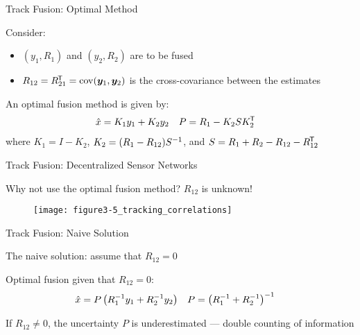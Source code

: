 \documentclass[aspectratio=1610]{beamer}
\begin{document}
\begin{frame}{Track Fusion: Optimal Method}

Consider:
\begin{itemize}
    \item $(y_1,R_1)$ and $(y_2,R_2)$ are to be fused
    \item $R_{12}=R_{21}^{\mkern-1.5mu\mathsf{T}}=\operatorname*{\rm cov}(\bm{y}_1,\bm{y}_2)$ is the cross-covariance between the estimates
\end{itemize}

An optimal fusion method is given by:
\begin{align*}
    \hat{x} &= K_1y_1 + K_2y_2 &
    P &= R_1 - K_2SK_2^{\mkern-1.5mu\mathsf{T}}
\end{align*}
where $K_1=I-K_2$, $K_2=(R_1-R_{12})S^{-1}$, and $S=R_1+R_2-R_{12}-R_{12}^{\mkern-1.5mu\mathsf{T}}$

\end{frame}


\begin{frame}{Track Fusion: Decentralized Sensor Networks}

Why not use the optimal fusion method? \alert{$R_{12}$ is unknown!}

\vspace{2em}

\begin{figure}
    \centering
    \texttt{[image: figure3-5\_tracking\_correlations]}
\end{figure}

\end{frame}


\begin{frame}{Track Fusion: Naive Solution}

The naive solution: \alert{assume that $R_{12}=0$}

\vspace{1em}

Optimal fusion given that $R_{12}=0$:
\begin{align*}
    \hat{x} &= P\left(R_1^{-1} y_1 + R_2^{-1} y_2  \right) &
    P &= \left(R_1^{-1} + R_2^{-1} \right)^{-1}
\end{align*}

\vspace{1em}

If $R_{12}\neq0$, the \alert{uncertainty $P$ is underestimated} --- double counting of information

\end{frame}
\end{document}
